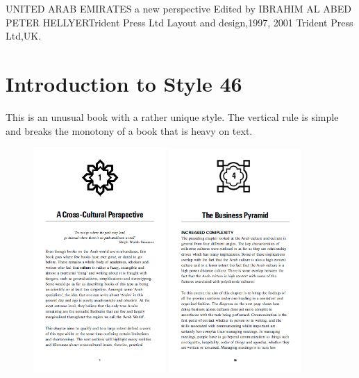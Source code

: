 UNITED ARAB EMIRATES
a new perspective
Edited by
IBRAHIM AL ABED
PETER HELLYERTrident Press Ltd
Layout and design,1997, 2001 Trident Press Ltd,UK.




\section{Introduction to Style 46}


This is an unusual book with a rather unique style. The vertical rule is simple and breaks the monotony of a book that is heavy on text.
\begin{figure}[ht]
\includegraphics[width=0.45\textwidth]{./chapters/chapter46}
\includegraphics[width=0.45\textwidth]{./chapters/chapter46a}
\end{figure}

